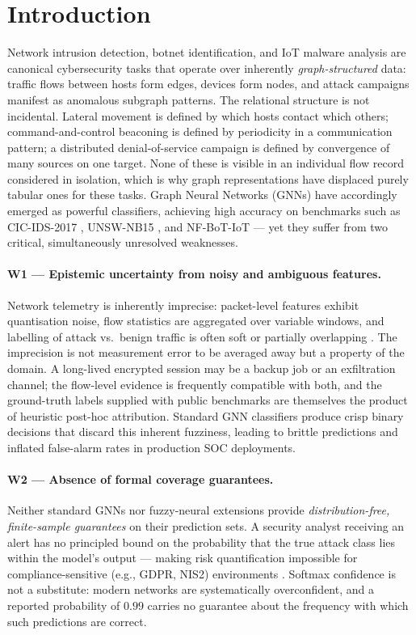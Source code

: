 \section{Introduction}
\label{sec:intro}

Network intrusion detection, botnet identification, and IoT malware analysis
are canonical cybersecurity tasks that operate over inherently
\emph{graph-structured} data: traffic flows between hosts form edges, devices
form nodes, and attack campaigns manifest as anomalous subgraph patterns.
The relational structure is not incidental. Lateral movement is defined by which
hosts contact which others; command-and-control beaconing is defined by
periodicity in a communication pattern; a distributed denial-of-service campaign
is defined by convergence of many sources on one target. None of these is
visible in an individual flow record considered in isolation, which is why graph
representations have displaced purely tabular ones for these tasks.
Graph Neural Networks (GNNs) have accordingly emerged as powerful classifiers,
achieving high accuracy on benchmarks such as CIC-IDS-2017
\citep{cicids2017}, UNSW-NB15 \citep{unswNB15}, and NF-BoT-IoT
\citep{nfbotiot} — yet they suffer from two critical, simultaneously
unresolved weaknesses.

\paragraph{W1 — Epistemic uncertainty from noisy and ambiguous features.}
Network telemetry is inherently imprecise: packet-level features exhibit
quantisation noise, flow statistics are aggregated over variable windows,
and labelling of attack vs.\ benign traffic is often soft or partially
overlapping \citep{graphids}.
The imprecision is not measurement error to be averaged away but a property of
the domain. A long-lived encrypted session may be a backup job or an
exfiltration channel; the flow-level evidence is frequently compatible with
both, and the ground-truth labels supplied with public benchmarks are themselves
the product of heuristic post-hoc attribution.
Standard GNN classifiers produce crisp binary decisions that discard this
inherent fuzziness, leading to brittle predictions and inflated
false-alarm rates in production SOC deployments.

\paragraph{W2 — Absence of formal coverage guarantees.}
Neither standard GNNs nor fuzzy-neural extensions provide
\emph{distribution-free, finite-sample guarantees} on their prediction sets.
A security analyst receiving an alert has no principled bound on the
probability that the true attack class lies within the model's output —
making risk quantification impossible for compliance-sensitive
(e.g., GDPR, NIS2) environments \citep{cp_survey}.
Softmax confidence is not a substitute: modern networks are systematically
overconfident, and a reported probability of $0.99$ carries no guarantee about
the frequency with which such predictions are correct.

